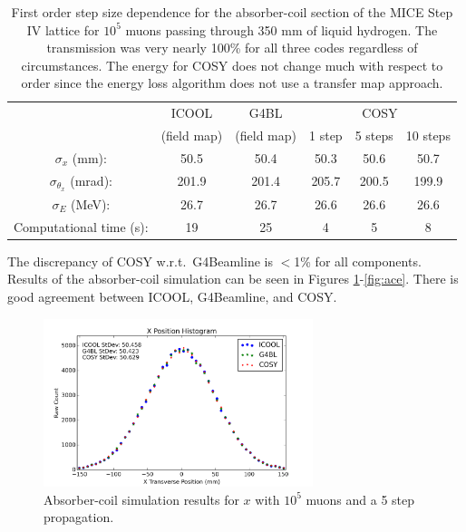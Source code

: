 \begin{table}
\caption[Step size dependence for the absorber-coil section of the MICE Step IV lattice for liquid hydrogen.]{First order step size dependence for the absorber-coil section of the MICE Step IV lattice for $10^5$ muons passing through 350 mm of liquid hydrogen. The transmission was very nearly 100\% for all three codes regardless of circumstances. The energy for COSY does not change much with respect to order since the energy loss algorithm does not use a transfer map approach.}
\begin{center}
\begin{tabularx}{\textwidth}{cccccc}
\hline \hline
& ICOOL & G4BL & \multicolumn{3}{c}{\sout{\hspace{1.5cm}} COSY \sout{\hspace{1.5cm}}}\\
& (field map) & (field map) & 1 step & 5 steps & 10 steps\\
\hline
$\sigma_x$ (mm): & 50.5 & 50.4 & 50.3 & 50.6 & 50.7\\
$\sigma_{\theta_x}$ (mrad): & 201.9 & 201.4 & 205.7 & 200.5 & 199.9\\
$\sigma_E$ (MeV): & 26.7 & 26.7 & 26.6 & 26.6 & 26.6\\
Computational time (s): & 19 & 25 & 4 & 5 & 8\\
\hline
\end{tabularx}
\end{center}
\label{tbl:mice_step_size_ac}
\end{table}

The discrepancy of COSY w.r.t.\ G4Beamline is $<$1\% for all components. Results of the absorber-coil simulation can be seen in Figures \ref{fig:acx}-\ref{fig:ace}. There is good agreement between ICOOL, G4Beamline, and COSY.

\begin{figure}[H]
  \centering
    \includegraphics[width=0.7\textwidth]{MICE data/absorber coils/x} 
  \caption{Absorber-coil simulation results for $x$ with $10^5$ muons and a 5 step propagation.}
  \label{fig:acx}
\end{figure}

